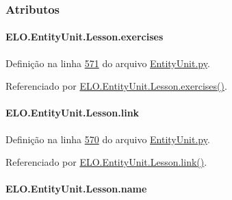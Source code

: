 \subsubsection{Atributos}
\hypertarget{classELO_1_1EntityUnit_1_1Lesson_a8d3db8bfbcfd47e9f7eef8f3bdc0ee3f}{
\paragraph[{exercises}]{\setlength{\rightskip}{0pt plus 5cm}E\-L\-O.\-Entity\-Unit.\-Lesson.\-exercises}}\label{classELO_1_1EntityUnit_1_1Lesson_a8d3db8bfbcfd47e9f7eef8f3bdc0ee3f}


Definição na linha \hyperlink{EntityUnit_8py_source_l00571}{571} do arquivo \hyperlink{EntityUnit_8py_source}{Entity\-Unit.\-py}.



Referenciado por \hyperlink{classELO_1_1EntityUnit_1_1Lesson_a49ad3f9952188497a01afdd31db8000c}{E\-L\-O.\-Entity\-Unit.\-Lesson.\-exercises()}.

\hypertarget{classELO_1_1EntityUnit_1_1Lesson_a5288d46b77e4b0cfd382857ef1b82fba}{
\paragraph[{link}]{\setlength{\rightskip}{0pt plus 5cm}E\-L\-O.\-Entity\-Unit.\-Lesson.\-link}}\label{classELO_1_1EntityUnit_1_1Lesson_a5288d46b77e4b0cfd382857ef1b82fba}


Definição na linha \hyperlink{EntityUnit_8py_source_l00570}{570} do arquivo \hyperlink{EntityUnit_8py_source}{Entity\-Unit.\-py}.



Referenciado por \hyperlink{classELO_1_1EntityUnit_1_1Lesson_a8560623b79e4379c2ba74aaf678a4764}{E\-L\-O.\-Entity\-Unit.\-Lesson.\-link()}.

\hypertarget{classELO_1_1EntityUnit_1_1Lesson_a1ca164978817a007dbec8193caae96ff}{
\paragraph[{name}]{\setlength{\rightskip}{0pt plus 5cm}E\-L\-O.\-Entity\-Unit.\-Lesson.\-name}}\label{classELO_1_1EntityUnit_1_1Lesson_a1ca164978817a007dbec8193caae96ff}


